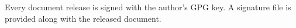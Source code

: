 \documentclass[letterpaper]{article}
\begin{document}
Every document release is signed with the author's GPG key. A signature file
is provided along with the released document.

\tableofcontents
\printglossary[type=\acronymtype,style=index]
\pagestyle{plain}





\appendix


\apptocmd{\thebibliography}{\raggedright}{}{}
\begingroup
{}
\setlength\bibitemsep{0pt}
\printbibliography
\endgroup
\end{document}
